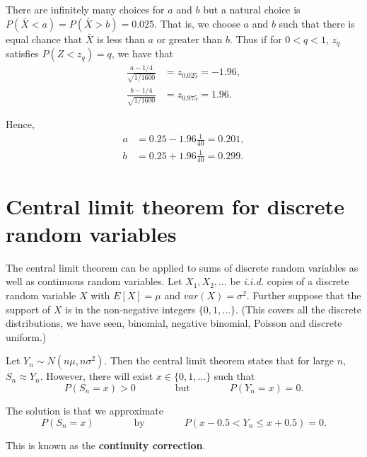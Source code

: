 \documentclass[
]{book}
\begin{document}
There are infinitely many choices for \(a\) and \(b\) but a natural choice is \(P(\bar{X}<a) = P (\bar{X}>b) = 0.025\). That is, we choose \(a\) and \(b\) such that there is equal chance that \(\bar{X}\) is less than \(a\) or greater than \(b\). Thus if for \(0 < q< 1\), \(z_q\) satisfies \(P(Z < z_q)=q\), we have that\\

\begin{align*}
\frac{a-1/4}{\sqrt{1/1600}} &= z_{0.025} = -1.96, \\
\frac{b-1/4}{\sqrt{1/1600}} &= z_{0.975} = 1.96.
\end{align*}

Hence,\\

\begin{align*}
a &= 0.25 - 1.96 \frac{1}{40} = 0.201, \\
b &= 0.25 + 1.96 \frac{1}{40} = 0.299.
\end{align*}

\hfill\break

\hypertarget{Sec_CLT:discrete}{%
\section{Central limit theorem for discrete random variables}\label{Sec_CLT:discrete}}

The central limit theorem can be applied to sums of discrete random variables as well as continuous random variables. Let \(X_1, X_2, \ldots\) be \emph{i.i.d.} copies of a discrete random variable \(X\) with \(E[X] =\mu\) and \(var(X) = \sigma^2\). Further suppose that the support of \(X\) is in the non-negative integers \(\{0,1, \ldots \}\). (This covers all the discrete distributions, we have seen, binomial, negative binomial, Poisson and discrete uniform.)

Let \(Y_n \sim N(n \mu, n \sigma^2)\). Then the central limit theorem states that for large \(n\), \(S_n \approx Y_n\). However, there will exist \(x \in \{0,1,\ldots \}\) such that\\

\[ P(S_n =x) >0 \qquad \qquad \mbox{but} \qquad \qquad P(Y_n =x) =0. \]

The solution is that we approximate\\

\[ P(S_n =x) \qquad \qquad \mbox{by} \qquad \qquad P(x - 0.5 <Y_n \leq x+0.5) =0. \]

This is known as the \textbf{continuity correction}.
\end{document}
